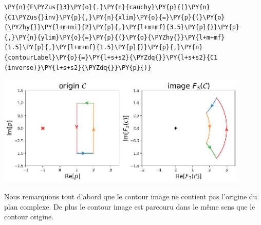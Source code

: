 \begin{tcolorbox}[breakable, size=fbox, boxrule=1pt, pad at break*=1mm,colback=cellbackground, colframe=cellborder]
\begin{Verbatim}[commandchars=\\\{\}]
\PY{n}{F\PYZus{}3}\PY{o}{.}\PY{n}{cauchy}\PY{p}{(}\PY{n}{C1\PYZus{}inv}\PY{p}{,}\PY{n}{xlim}\PY{o}{=}\PY{p}{(}\PY{o}{\PYZhy{}}\PY{l+m+mi}{2}\PY{p}{,}\PY{l+m+mf}{3.5}\PY{p}{)}\PY{p}{,}\PY{n}{ylim}\PY{o}{=}\PY{p}{(}\PY{o}{\PYZhy{}}\PY{l+m+mf}{1.5}\PY{p}{,}\PY{l+m+mf}{1.5}\PY{p}{)}\PY{p}{,}\PY{n}{contourLabel}\PY{o}{=}\PY{l+s+s2}{\PYZdq{}}\PY{l+s+s2}{C1 (inverse)}\PY{l+s+s2}{\PYZdq{}}\PY{p}{)}
\end{Verbatim}
\end{tcolorbox}
\begin{center}
    \includegraphics[width=0.9\textwidth]{notebook/fig/output_33_1.eps}
\end{center}
Nous remarquons tout d'abord que le contour image ne contient pas
l'origine du plan complexe. De plus le contour image est parcouru dans
le même sens que le contour origine. 
